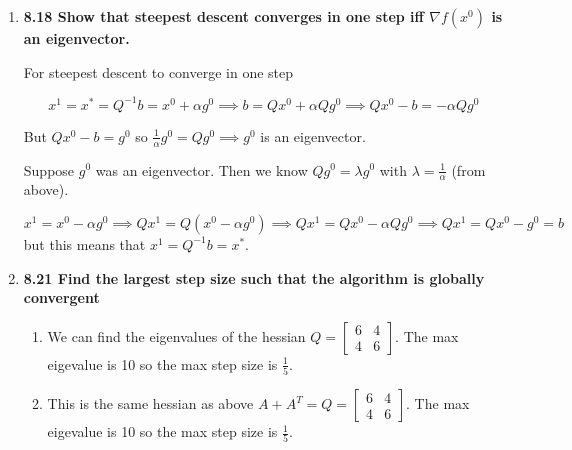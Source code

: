\documentclass[10pt,a4paper]{article}
\begin{document}
\begin{enumerate}
    \item \textbf{8.18 Show that steepest descent converges in one step iff $\nabla f(x^0)$ is an eigenvector.}
    
    For steepest descent to converge in one step 

    $$x^1 = x^* = Q^{-1}b = x^0 + \alpha g^0 \implies b = Qx^0 + \alpha Qg^0 \implies Qx^0 - b = - \alpha Qg^0 $$

    But $Qx^0 -b = g^0$ so $\frac{1}{\alpha}g^0 =  Qg^0 \implies g^0$ is an eigenvector.

    Suppose $g^0$ was an eigenvector. Then we know $Qg^0 = \lambda g^0$ with $\lambda = \frac{1}{\alpha}$ (from above).

    $$x^1  = x^0 - \alpha g^0 \implies Qx^1 = Q(x^0 - \alpha g^0) \implies Qx^1 = Qx^0 -  \alpha Q g^0 \implies Qx^1 = Qx^0 - g^0 = b $$
    but this means that $x^1 = Q^{-1}b = x^*$.
    
    \item \textbf{8.21 Find the largest step size such that the algorithm is globally convergent}
    \begin{enumerate}
        \item We can find the eigenvalues of the hessian $Q = \begin{bmatrix}6 & 4 \\ 4 & 6 \end{bmatrix}$. The max eigevalue is 10 so the max step size is $\frac{1}{5}$.
        \item This is the same hessian as above $A+A^T = Q = \begin{bmatrix}6 & 4 \\ 4 & 6 \end{bmatrix}$. The max eigevalue is 10 so the max step size is $\frac{1}{5}$.
    \end{enumerate}

\end{enumerate}
\end{document}
